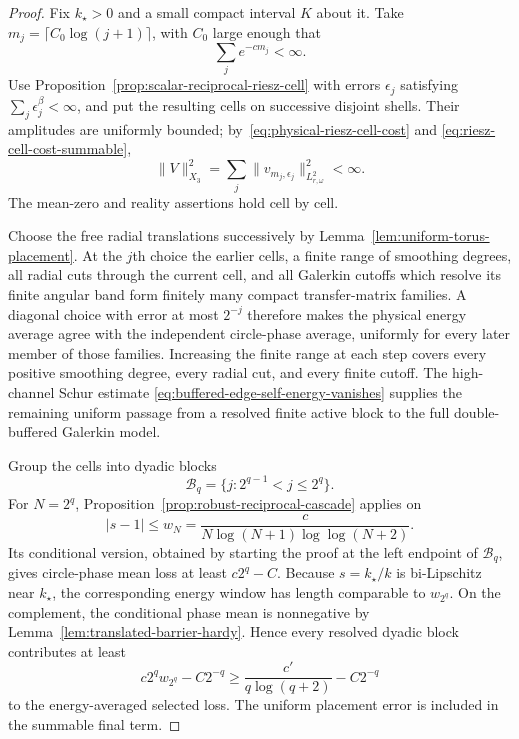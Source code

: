 \begin{proof}
Fix $k_\star>0$ and a small compact interval $K$ about it.  Take
$m_j=\lceil C_0\log(j+1)\rceil$, with $C_0$ large enough that
\begin{equation}
 \sum_j e^{-cm_j}<\infty.
 \label{eq:riesz-cell-cost-summable}
\end{equation}
Use Proposition~\ref{prop:scalar-reciprocal-riesz-cell} with errors
$\epsilon_j$ satisfying $\sum_j\epsilon_j^\beta<\infty$, and put the resulting
cells on successive disjoint shells.  Their amplitudes are uniformly bounded;
by~\eqref{eq:physical-riesz-cell-cost} and
\eqref{eq:riesz-cell-cost-summable},
\begin{equation}
 \|V\|_{X_3}^2
 =\sum_j\|v_{m_j,\epsilon_j}\|_{L^2_{r,\omega}}^2<\infty.
 \label{eq:fixed-riesz-potential-cost}
\end{equation}
The mean-zero and reality assertions hold cell by cell.

Choose the free radial translations successively by
Lemma~\ref{lem:uniform-torus-placement}.  At the $j$th choice the earlier
cells, a finite range of smoothing degrees, all radial cuts through the
current cell, and all Galerkin cutoffs which resolve its finite angular band
form finitely many compact transfer-matrix families.  A diagonal choice with
error at most $2^{-j}$ therefore makes the physical energy average agree with
the independent circle-phase average, uniformly for every later member of
those families.  Increasing the finite range at each step covers every
positive smoothing degree, every radial cut, and every finite cutoff.  The
high-channel Schur estimate
\eqref{eq:buffered-edge-self-energy-vanishes} supplies the remaining uniform
passage from a resolved finite active block to the full double-buffered
Galerkin model.

Group the cells into dyadic blocks
\begin{equation}
 \mathcal B_q=\{j:2^{q-1}<j\leq2^q\}.
\end{equation}
For $N=2^q$, Proposition~\ref{prop:robust-reciprocal-cascade} applies on
\begin{equation}
 |s-1|\leq w_N
 =\frac{c}{N\log(N+1)\log\log(N+2)}.
\end{equation}
Its conditional version, obtained by starting the proof at the left endpoint
of $\mathcal B_q$, gives circle-phase mean loss at least $c2^q-C$.  Because
$s=k_\star/k$ is bi-Lipschitz near $k_\star$, the corresponding energy window
has length comparable to $w_{2^q}$.  On the complement, the conditional phase
mean is nonnegative by Lemma~\ref{lem:translated-barrier-hardy}.  Hence every
resolved dyadic block contributes at least
\begin{equation}
 c2^qw_{2^q}-C2^{-q}
 \geq \frac{c'}{q\log(q+2)}-C2^{-q}
 \label{eq:dyadic-block-entropy-gain}
\end{equation}
to the energy-averaged selected loss.  The uniform placement error is included
in the summable final term.


\end{proof}
